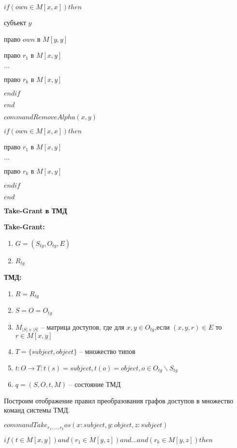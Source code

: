 		$if (own \in M[x,x]) then $

		 субъект $y$

		 право $own$ в $M[y,y]$

		 право $r_1$ в $M[x,y]$

		$\ldots$

		 право $r_k$ в $M[x,y]$

		$endif$

		$end$



		$command  RemoveAlpha(x,y)$

		$if (own \in M[x,x]) then $

		 право $r_1$ в $M[x,y]$

		$\ldots$

		 право $r_k$ в $M[x,y]$

		$endif$

		$end$


	\textbf{Take-Grant в ТМД}

	\textbf{Take-Grant:}

	\begin{enumerate}
		\item $G=(S_{tg}, O_{tg}, E)$
		\item $R_{tg}$
	\end{enumerate}

	\textbf{ТМД:}

	\begin{enumerate}
		\item $R = R_{tg}$
		\item $S = O = O_{tg}$
		\item $M_{|S| \times |S|}$ -- матрица доступов, где для $x,y \in O_{tg}$,если $(x, y, r) \in E$ то $r \in M[x,y]$
		\item $T = \{subject, object\}$ -- множество типов
		\item $t: O \to T : t(s) = subject, t(o) = object, o \in O_{tg} \backslash S_{tg}$
		\item $q = (S, O, t, M)$ -- состояние ТМД
	\end{enumerate}


	Построим отображение правил преобразования графов доступов в множество команд системы ТМД.


		$command  Take_{r_1, \ldots, r_k}os(x: subject,y:object,z:subject)$

		$if (t \in M[x,y]) and (r_1 \in M[y,z])and  \ldots and (r_k \in M[y,z]) then $

